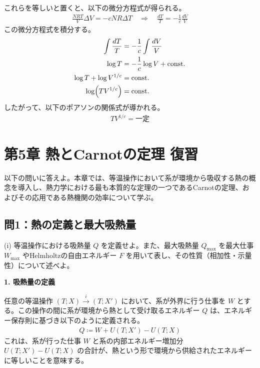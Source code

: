 \documentclass[a4paper,12pt]{jlreq}
\begin{document}
これらを等しいと置くと、以下の微分方程式が得られる。
\begin{align}
  \frac{NRT}{V} \Delta V = -cNR \Delta T \quad \Longrightarrow \quad \frac{dT}{T} = -\frac{1}{c} \frac{dV}{V}
\end{align}
この微分方程式を積分する。
\begin{align}
  \int \frac{dT}{T} &= -\frac{1}{c} \int \frac{dV}{V} \notag \\
  \log T &= -\frac{1}{c} \log V + \text{const.} \notag \\
  \log T + \log V^{1/c} &= \text{const.} \notag \\
  \log (T V^{1/c}) &= \text{const.}
\end{align}
したがって、以下のポアソンの関係式が導かれる。
\begin{align}
  T V^{1/c} = \text{一定}
\end{align}





\newpage

\section*{第5章 熱とCarnotの定理 復習}

以下の問いに答えよ。本章では、等温操作において系が環境から吸収する熱の概念を導入し、熱力学における最も本質的な定理の一つであるCarnotの定理、およびその応用である熱機関の効率について学ぶ。
\subsection*{問1：熱の定義と最大吸熱量}

\begin{itembox}[l]{(i)}
  等温操作における吸熱量 $Q$ を定義せよ。また、最大吸熱量 $Q_{\max}$ を最大仕事 $W_{\max}$ やHelmholtzの自由エネルギー $F$ を用いて表し、その性質（相加性・示量性）について述べよ。
\end{itembox}

\vspace{5mm}

\par
\textbf{1. 吸熱量の定義} \par
任意の等温操作 $(T; X) \xrightarrow{i} (T; X')$ において、系が外界に行う仕事を $W$ とする。この操作の間に系が環境から熱として受け取るエネルギー $Q$ は、エネルギー保存則に基づき以下のように定義される。
\begin{align}
  Q \coloneqq W + U(T; X') - U(T; X)
\end{align}
これは、系が行った仕事 $W$ と系の内部エネルギー増加分 $U(T; X') - U(T; X)$ の合計が、熱という形で環境から供給されたエネルギーに等しいことを意味する。
\end{document}
